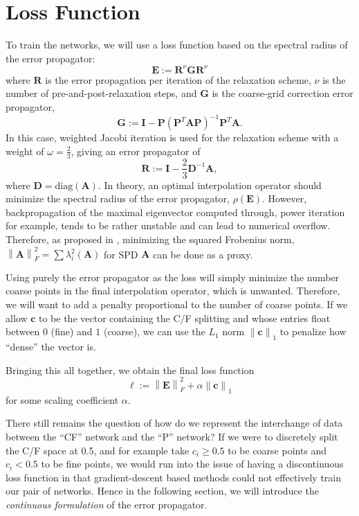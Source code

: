 \documentclass{article}
\newcommand{\norm}[1]{\left\lVert#1\right\rVert}
\newcommand{\mat}[1]{\bm{{#1}}}
\renewcommand{\vec}[1]{\bm{{#1}}}
\begin{document}
\section{Loss Function}
To train the networks, we will use a loss function based on the spectral radius of the error propagator:
\begin{equation}
  \mat{E} := \mat{R}^\nu \mat{G} \mat{R}^\nu
\end{equation}
where $\mat{R}$ is the error propagation per iteration of the relaxation scheme, $\nu$ is the number of pre-and-post-relaxation steps, and $\mat{G}$ is the coarse-grid correction error propagator,
\begin{equation}
  \mat{G} := \mat{I} - \mat{P} \left( \mat{P}^T \mat{A} \mat{P} \right)^{-1} \mat{P}^T \mat{A}.
\end{equation}
In this case, weighted Jacobi iteration is used for the relaxation scheme with a weight of $\omega=\frac{2}{3}$, giving an error propagator of
\begin{equation}
  \mat{R} := \mat{I} - \frac{2}{3}\mat{D}^{-1}\mat{A},
\end{equation}
where $\mat{D}=\text{diag}\left(\mat{A}\right)$.  In theory, an optimal interpolation operator should minimize the spectral radius of the error propagator, $\rho\left(\mat{E}\right)$.  However, backpropagation of the maximal eigenvector computed through, power iteration for example, tends to be rather unstable and can lead to numerical overflow\cite{wang2019backpropagationfriendly}.  Therefore, as proposed in \cite{luz2020learning}, minimizing the squared Frobenius norm, $\norm{\mat{A}}_F^2=\sum\lambda^2_i\left(\mat{A}\right)$ for SPD $\mat{A}$ can be done as a proxy.

Using purely the error propagator as the loss will simply minimize the number coarse points in the final interpolation operator, which is unwanted.  Therefore, we will want to add a penalty proportional to the number of coarse points.  If we allow $\vec{c}$ to be the vector containing the C/F splitting and whose entries float between $0$ (fine) and $1$ (coarse), we can use the $L_1$ norm $\norm{\vec{c}}_1$ to penalize how ``dense'' the vector is.

Bringing this all together, we obtain the final loss function
\begin{equation}
  \ell := \norm{\mat{E}}^2_F + \alpha \norm{\vec{c}}_1 \label{eqn:loss}
\end{equation}
for some scaling coefficient $\alpha$.

There still remains the question of how do we represent the interchange of data between the ``CF'' network and the ``P'' network?  If we were to discretely split the C/F space at 0.5, and for example take $c_i\geq 0.5$ to be coarse points and $c_i<0.5$ to be fine points, we would run into the issue of having a discontinuous loss function in that gradient-descent based methods could not effectively train our pair of networks.   Hence in the following section, we will introduce the \textit{continuous formulation} of the error propagator.
\end{document}
